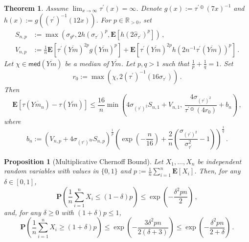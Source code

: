 \documentclass[10pt,a4paper]{amsart}
\newtheorem{theorem}{Theorem}
\newtheorem{proposition}{Proposition}
\newcommand{\E}{\mathbf{E}} %
\newcommand{\EOf}[1]{\E\abOf{#1}}
\renewcommand{\Pr}{\mathbf{P}} %
\newcommand{\PrOf}[1]{\Pr\brOf{#1}}
\newcommand{\R}{\mathbb{R}}
\newcommand{\Rpp}{\R_{>0}}
\newcommand{\ab}[1]{\lab #1 \rab} %
\newcommand{\abOf}[1]{\!\ab{#1}} %
\newcommand{\br}[1]{\lb #1 \rb} %
\newcommand{\brOf}[1]{\!\br{#1}} %
\newcommand{\ddrtran}{\tau^{\prime\oplus}}
\newcommand{\dtran}{\tau\pr}
\newcommand{\eqcm}{\,,} %
\newcommand{\eqfs}{\,.}
\newcommand{\invdtran}{(\tau\pr)^{-1}}
\newcommand{\lab}{\left[} %
\newcommand{\lb}{\left(} %
\newcommand{\median}{\mathsf{med}}
\newcommand{\ol}[2]{\overline{#1#2}}
\newcommand{\pr}{^\prime}
\newcommand{\rab}{\right]} %
\newcommand{\rb}{\right)} %
\newcommand{\tran}{\tau}
\begin{document}
\begin{theorem}\label{thm:infdtr:improved}
    Assume $\lim_{x\to\infty}\dtran(x) = \infty$.
    Denote $g(x) := \ddrtran(7 x)^{-1}$ and $h(x) := g(\invdtran(12 x))$.
    For $p\in\Rpp$, set
    \begin{align}
        S_{n,p} &:= \max\brOf{
            \sigma_{g^p}, 
            2 h(\sigma_{\dtran})^p,
            \EOf{ h(2\hat\sigma_{\dtran})^p}
        }\eqcm
        \\
        V_{n,p} &:= \frac1n  \EOf{\dtran(\ol{Y}m)^{2p} g(\ol{Y}{m})^p}  + 	\EOf{\dtran(\ol{Y}m)^{2p} h(2n^{-1} \dtran(\ol{Y}m))^p}\eqfs
    \end{align}
    Let $\chi \in  \median(\ol Ym)$ be a median of $\ol Ym$. 
    Let $p,q > 1$ such that $\frac1p + \frac1q = 1$.
    Set 
    \begin{equation}
        r_0 := \max\brOf{\chi, 2 \invdtran\brOf{16 \sigma_{\dtran}}}\eqfs
    \end{equation}
    Then
    \begin{equation}
        \EOf{\tran(\ol Y{m_n}) - \tran(\ol Ym)}
        \leq
        \frac{16}{n} \min\brOf{4 \sigma_{(\dtran)^{2}} S_{n,1} + V_{n,1},\, \frac{4 \sigma_{(\dtran)^2}}{\ddrtran(4r_0)} + b_n} 
        \eqcm
    \end{equation}
    where
    \begin{equation}
        b_n := \br{V_{n,p} + 4 \sigma_{(\dtran)^{2p}} S_{n,p}}^{\frac1p} \br{\exp\brOf{-\frac{n}{16}} +  \frac2n \br{\frac{\sigma_{(\dtran)^2}}{\sigma_{\dtran}^2}-1}}^{\frac1q}
        \eqfs
    \end{equation}
\end{theorem}

\begin{proposition}[Multiplicative Chernoff Bound]\label{prp:chernoff:multi}
    Let $X_1, \dots, X_n$ be independent random variables with values in
    $\{0, 1\}$ and $p := \frac1n \sum_{i=1}^n \EOf{X_i}$.
    Then, for any $\delta \in [0,1]$,
    \begin{equation}
        \PrOf{\frac1n \sum_{i=1}^n X_i \leq (1 - \delta)p}
        \leq
        \exp\brOf{-\frac{\delta^2 p n}{2}}
        \eqcm
    \end{equation}
    and, for any $\delta \geq 0$ with $(1+\delta)p \leq 1$,
    \begin{equation}
        \PrOf{\frac1n \sum_{i=1}^n X_i \geq (1 + \delta)p}
        \leq
        \exp\brOf{-\frac{3 \delta^2 p n}{2(\delta+3)}}
        \leq
        \exp\brOf{-\frac{\delta^2 p n}{2 + \delta}}
        \eqfs
    \end{equation}
\end{proposition}
\end{document}
